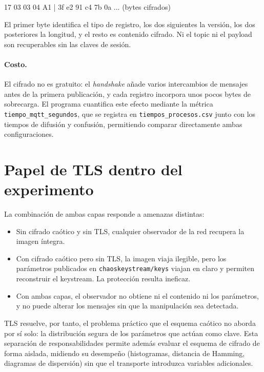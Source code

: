 \documentclass[12pt,a4paper]{article}
\begin{document}
\begin{center}
\ttfamily\small
17 03 03 04 A1 | 3f e2 91 c4 7b 0a ... (bytes cifrados)
\end{center}

El primer byte identifica el tipo de registro, los dos siguientes la versión, los dos posteriores la longitud, y el resto es contenido cifrado. Ni el topic ni el payload son recuperables sin las claves de sesión.

\paragraph{Costo.} El cifrado no es gratuito: el \textit{handshake} añade varios intercambios de mensajes antes de la primera publicación, y cada registro incorpora unos pocos bytes de sobrecarga. El programa cuantifica este efecto mediante la métrica \texttt{tiempo\_mqtt\_segundos}, que se registra en \texttt{tiempos\_procesos.csv} junto con los tiempos de difusión y confusión, permitiendo comparar directamente ambas configuraciones.

\section{Papel de TLS dentro del experimento}

La combinación de ambas capas responde a amenazas distintas:

\begin{itemize}[leftmargin=1.4cm]
	\item Sin cifrado caótico y sin TLS, cualquier observador de la red recupera la imagen íntegra.
	\item Con cifrado caótico pero sin TLS, la imagen viaja ilegible, pero los parámetros publicados en \texttt{chaoskeystream/keys} viajan en claro y permiten reconstruir el keystream. La protección resulta ineficaz.
	\item Con ambas capas, el observador no obtiene ni el contenido ni los parámetros, y no puede alterar los mensajes sin que la manipulación sea detectada.
\end{itemize}

TLS resuelve, por tanto, el problema práctico que el esquema caótico no aborda por sí solo: la distribución segura de los parámetros que actúan como clave. Esta separación de responsabilidades permite además evaluar el esquema de cifrado de forma aislada, midiendo su desempeño (histogramas, distancia de Hamming, diagramas de dispersión) sin que el transporte introduzca variables adicionales.
\end{document}
